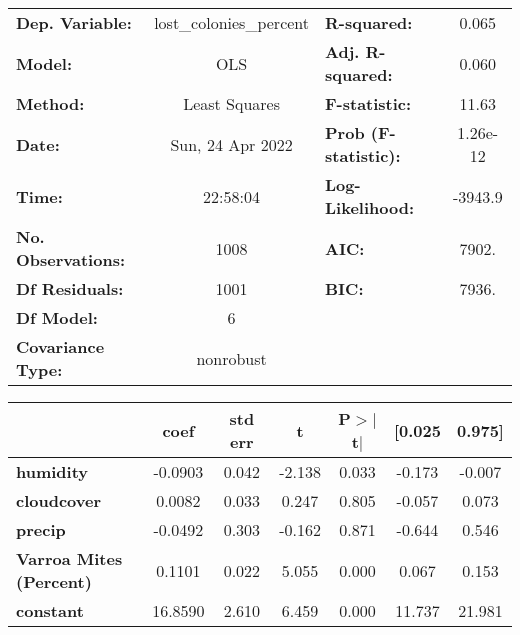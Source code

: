 \begin{center}
\begin{tabular}{lclc}
\toprule
\textbf{Dep. Variable:}         & lost\_colonies\_percent & \textbf{  R-squared:         } &     0.065   \\
\textbf{Model:}                 &           OLS           & \textbf{  Adj. R-squared:    } &     0.060   \\
\textbf{Method:}                &      Least Squares      & \textbf{  F-statistic:       } &     11.63   \\
\textbf{Date:}                  &     Sun, 24 Apr 2022    & \textbf{  Prob (F-statistic):} &  1.26e-12   \\
\textbf{Time:}                  &         22:58:04        & \textbf{  Log-Likelihood:    } &   -3943.9   \\
\textbf{No. Observations:}      &            1008         & \textbf{  AIC:               } &     7902.   \\
\textbf{Df Residuals:}          &            1001         & \textbf{  BIC:               } &     7936.   \\
\textbf{Df Model:}              &               6         & \textbf{                     } &             \\
\textbf{Covariance Type:}       &        nonrobust        & \textbf{                     } &             \\
\bottomrule
\end{tabular}
\begin{tabular}{lcccccc}
                                & \textbf{coef} & \textbf{std err} & \textbf{t} & \textbf{P$> |$t$|$} & \textbf{[0.025} & \textbf{0.975]}  \\
\midrule
\textbf{humidity}               &      -0.0903  &        0.042     &    -2.138  &         0.033        &       -0.173    &       -0.007     \\
\textbf{cloudcover}             &       0.0082  &        0.033     &     0.247  &         0.805        &       -0.057    &        0.073     \\
\textbf{precip}                 &      -0.0492  &        0.303     &    -0.162  &         0.871        &       -0.644    &        0.546     \\
\textbf{Varroa Mites (Percent)} &       0.1101  &        0.022     &     5.055  &         0.000        &        0.067    &        0.153     \\
\textbf{constant}               &      16.8590  &        2.610     &     6.459  &         0.000        &       11.737    &       21.981     \\

\end{tabular}
\end{center}
